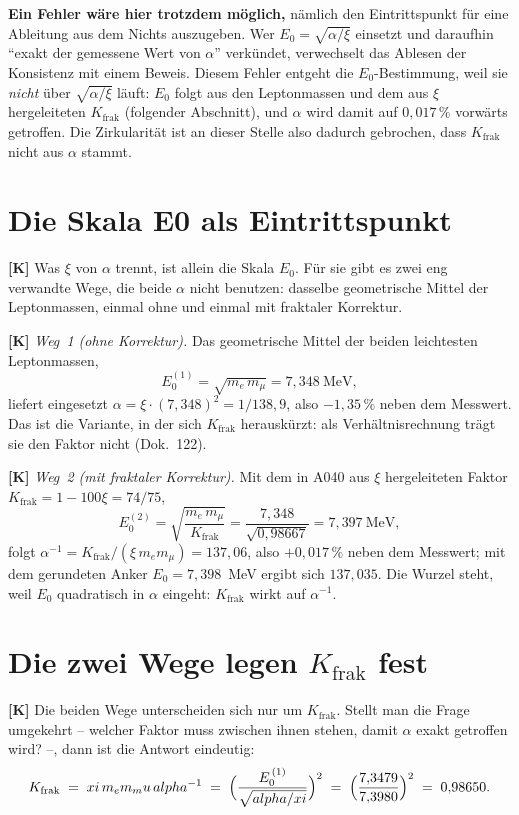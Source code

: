 \textbf{Ein Fehler wäre hier trotzdem möglich,} nämlich den Eintrittspunkt für
eine Ableitung aus dem Nichts auszugeben. Wer $E_0 = \sqrt{\alpha/\xi}$ einsetzt
und daraufhin \enquote{exakt der gemessene Wert von $\alpha$} verkündet,
verwechselt das Ablesen der Konsistenz mit einem Beweis. Diesem Fehler entgeht
die $E_0$-Bestimmung, weil sie \emph{nicht} über $\sqrt{\alpha/\xi}$ läuft:
$E_0$ folgt aus den Leptonmassen und dem aus $\xi$ hergeleiteten $K_\text{frak}$
(folgender Abschnitt), und $\alpha$ wird damit auf $0{,}017\,\%$ vorwärts
getroffen. Die Zirkularität ist an dieser Stelle also dadurch gebrochen, dass
$K_\text{frak}$ nicht aus $\alpha$ stammt.

\section{Die Skala E0 als Eintrittspunkt}

\textbf{[K]} Was $\xi$ von $\alpha$ trennt, ist allein die Skala $E_0$. Für sie
gibt es zwei eng verwandte Wege, die beide $\alpha$ nicht benutzen: dasselbe
geometrische Mittel der Leptonmassen, einmal ohne und einmal mit fraktaler
Korrektur.

\textbf{[K]} \emph{Weg~1 (ohne Korrektur).} Das geometrische Mittel der beiden
leichtesten Leptonmassen,
\[
  E_0^{(1)} = \sqrt{m_e\,m_\mu} = 7{,}348\ \text{MeV},
\]
liefert eingesetzt $\alpha = \xi\cdot(7{,}348)^2 = 1/138{,}9$, also $-1{,}35\,\%$
neben dem Messwert. Das ist die Variante, in der sich $K_\text{frak}$
herauskürzt: als Verhältnisrechnung trägt sie den Faktor nicht (Dok.~122).

\textbf{[K]} \emph{Weg~2 (mit fraktaler Korrektur).} Mit dem in A040 aus $\xi$
hergeleiteten Faktor $K_\text{frak} = 1-100\xi = 74/75$,
\[
  E_0^{(2)} = \sqrt{\frac{m_e\,m_\mu}{K_\text{frak}}}
  = \frac{7{,}348}{\sqrt{0{,}98667}} = 7{,}397\ \text{MeV},
\]
folgt $\alpha^{-1} = K_\text{frak}/(\xi\,m_e m_\mu) = 137{,}06$, also $+0{,}017\,\%$
neben dem Messwert; mit dem gerundeten Anker $E_0 = 7{,}398$~MeV ergibt sich
$137{,}035$. Die Wurzel steht, weil $E_0$ quadratisch in $\alpha$ eingeht:
$K_\text{frak}$ wirkt auf $\alpha^{-1}$.

\section{Die zwei Wege legen $K_\text{frak}$ fest}

\textbf{[K]} Die beiden Wege unterscheiden sich nur um $K_\text{frak}$. Stellt man
die Frage umgekehrt -- welcher Faktor muss zwischen ihnen stehen, damit $\alpha$
exakt getroffen wird? --, dann ist die Antwort eindeutig:
\[
  K_\text{frak} \;=\; \xi\,m_e m_\mu\,\alpha^{-1}
  \;=\; \Bigl(\frac{E_0^{\,(1)}}{\sqrt{\alpha/\xi}}\Bigr)^{2}
  \;=\; \Bigl(\frac{7{,}3479}{7{,}3980}\Bigr)^{2} \;=\; 0{,}98650 .
\]

